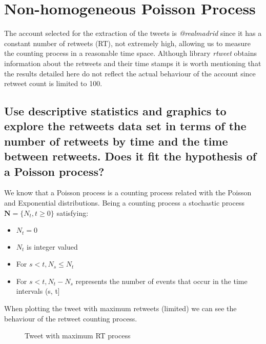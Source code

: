 
\section{Non-homogeneous Poisson Process}

The account selected for the extraction of the tweets is \textit{@realmadrid} since it has a constant number of retweets (RT), not extremely high, allowing us to measure the counting process in a reasonable time space. Although library \textit{rtweet} obtains information about the retweets and their time stamps it is worth mentioning that the results detailed here do not reflect the actual behaviour of the account since retweet count is limited to 100.

\subsection{Use descriptive statistics and graphics to explore the retweets data set in terms of the number of retweets by time and the time between retweets. Does it fit the hypothesis of a Poisson process?}

We know that a Poisson process is a counting process related with the Poisson and Exponential distributions. Being a counting process a stochastic process $\mathbf{N} = \{ N_t, t \geq 0 \}$ satisfying:
\begin{itemize}
	\item $N_t=0$
	\item $N_t$ is integer valued
	\item For $s<t, N_s \leq N_t$
	\item For $s<t, N_t - N_s$ represents the number of events that occur in the time intervals (s, t]
\end{itemize}

When plotting the tweet with maximum retweets (limited) we can see the behaviour of the retweet counting process.
\begin{figure}[H]
	\centering
	
	\vspace*{-0.9em}
	\caption{Tweet with maximum RT process}
\end{figure}